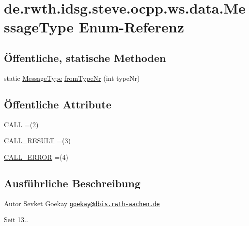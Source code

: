 \hypertarget{enumde_1_1rwth_1_1idsg_1_1steve_1_1ocpp_1_1ws_1_1data_1_1_message_type}{\section{de.\-rwth.\-idsg.\-steve.\-ocpp.\-ws.\-data.\-Message\-Type Enum-\/\-Referenz}
\label{enumde_1_1rwth_1_1idsg_1_1steve_1_1ocpp_1_1ws_1_1data_1_1_message_type}
}
\subsection*{Öffentliche, statische Methoden}
\begin{DoxyCompactItemize}
\item 
static \hyperlink{enumde_1_1rwth_1_1idsg_1_1steve_1_1ocpp_1_1ws_1_1data_1_1_message_type}{Message\-Type} \hyperlink{enumde_1_1rwth_1_1idsg_1_1steve_1_1ocpp_1_1ws_1_1data_1_1_message_type_a4fa62c1551fc82b3a389119a6f2cc000}{from\-Type\-Nr} (int type\-Nr)
\end{DoxyCompactItemize}
\subsection*{Öffentliche Attribute}
\begin{DoxyCompactItemize}
\item 
\hyperlink{enumde_1_1rwth_1_1idsg_1_1steve_1_1ocpp_1_1ws_1_1data_1_1_message_type_a8c9631be897fe932418c583d7aecf89e}{C\-A\-L\-L} =(2)
\item 
\hyperlink{enumde_1_1rwth_1_1idsg_1_1steve_1_1ocpp_1_1ws_1_1data_1_1_message_type_a4bc539499fbd752d76ede7c8768c4f38}{C\-A\-L\-L\-\_\-\-R\-E\-S\-U\-L\-T} =(3)
\item 
\hyperlink{enumde_1_1rwth_1_1idsg_1_1steve_1_1ocpp_1_1ws_1_1data_1_1_message_type_a9e7086380926a62f0316b519da21ccea}{C\-A\-L\-L\-\_\-\-E\-R\-R\-O\-R} =(4)
\end{DoxyCompactItemize}


\subsection{Ausführliche Beschreibung}
\begin{DoxyAuthor}{Autor}
Sevket Goekay \href{mailto:goekay@dbis.rwth-aachen.de}{\tt goekay@dbis.\-rwth-\/aachen.\-de} 
\end{DoxyAuthor}
\begin{DoxySince}{Seit}
13.. 
\end{DoxySince}


